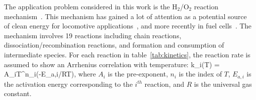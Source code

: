 The application problem considered in this work is the
H$_2$/O$_2$ reaction mechanism~\cite{Yetter:1991}. This mechanism has gained
a lot of attention as a potential source of clean energy for
locomotive applications~\cite{Das:1996}, and more recently in fuel
 cells~\cite{Loges:2008,Cosnier:2016}. 
The mechanism involves 19
reactions including chain reactions, dissociation/recombination reactions, and
formation and consumption of intermediate species. For each reaction in
table~\ref{tab:kinetics}, the reaction rate is assumed to show an Arrhenius
correlation with temperature:
%
\be
k_i(T) = A_iT^{n_i}\exp(-E_{a,i}/RT), 
\label{eq:rate}
\ee
%
where $A_i$ is the pre-exponent, $n_i$ is the index of $T$, $E_{a,i}$ is the
activation energy corresponding to the $i^{th}$ reaction, and $R$ is the
universal gas constant.  

